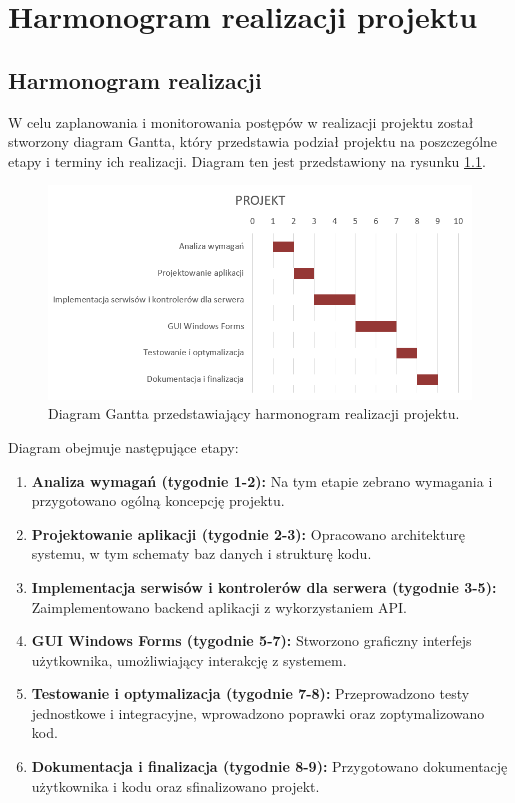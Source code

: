 \chapter{Harmonogram realizacji projektu}

\section{Harmonogram realizacji}

W celu zaplanowania i monitorowania postępów w realizacji projektu został stworzony diagram Gantta, który przedstawia podział projektu na poszczególne etapy i terminy ich realizacji. Diagram ten jest przedstawiony na rysunku \ref{fig:gantt}.

\begin{figure}[h!]
    \centering
    \includegraphics[width=\textwidth]{figures/diagram.png}
    \caption{Diagram Gantta przedstawiający harmonogram realizacji projektu.}
    \label{fig:gantt}
\end{figure}

Diagram obejmuje następujące etapy:
\begin{enumerate}
    \item \textbf{Analiza wymagań (tygodnie 1-2):} Na tym etapie zebrano wymagania i przygotowano ogólną koncepcję projektu.
    \item \textbf{Projektowanie aplikacji (tygodnie 2-3):} Opracowano architekturę systemu, w tym schematy baz danych i strukturę kodu.
    \item \textbf{Implementacja serwisów i kontrolerów dla serwera (tygodnie 3-5):} Zaimplementowano backend aplikacji z wykorzystaniem API.
    \item \textbf{GUI Windows Forms (tygodnie 5-7):} Stworzono graficzny interfejs użytkownika, umożliwiający interakcję z systemem.
    \item \textbf{Testowanie i optymalizacja (tygodnie 7-8):} Przeprowadzono testy jednostkowe i integracyjne, wprowadzono poprawki oraz zoptymalizowano kod.
    \item \textbf{Dokumentacja i finalizacja (tygodnie 8-9):} Przygotowano dokumentację użytkownika i kodu oraz sfinalizowano projekt.
\end{enumerate}

